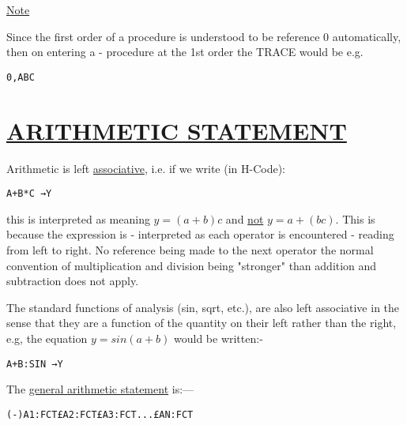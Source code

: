 \documentclass[10pt, a4paper, oneside]{article}
\newcommand{\myuline}[1]{\uline{#1}}
\begin{document}
\begin{multicols}{2}
\begin{flushleft}
\myuline{Note}
\end{flushleft}

Since the first order of a procedure is understood
to be reference 0 automatically, then on entering a
- procedure at the 1st order the TRACE would be e.g.

\begin{addmargin}[1cm]{1em}%
\begin{lstlisting}
0,ABC
\end{lstlisting}
\end{addmargin}


\section{\myuline{ARITHMETIC STATEMENT}}

Arithmetic is left \myuline{associative}, i.e. if we write
(in H-Code):~

\begin{addmargin}[1cm]{1em}%
\begin{lstlisting}
A+B*C →Y
\end{lstlisting}
\end{addmargin}

this is interpreted as meaning $y = (a+b)c$ and \myuline{not}
$y = a+(bc)$.  This is because the expression is
- interpreted as each operator is encountered - reading
from left to right.  No reference being made to the
next operator the normal convention of multiplication
and division being "stronger" than addition and
subtraction does not apply.

The standard functions of analysis (sin, sqrt,
etc.), are also left associative in the sense that they
are a function of the quantity on their left rather
than the right, e.g, the equation $y = sin(a+b)$ would
be written:-

\begin{addmargin}[1cm]{1em}%
\begin{lstlisting}
A+B:SIN →Y
\end{lstlisting}
\end{addmargin}

The \myuline{general arithmetic statement} is:—

\begin{addmargin}[1cm]{1em}%
\begin{lstlisting}
(-)A1:FCT£A2:FCT£A3:FCT...£AN:FCT
\end{lstlisting}
\end{addmargin}


\end{multicols}
\end{document}
